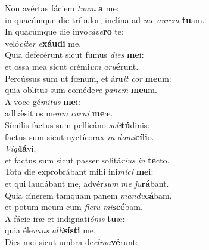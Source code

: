 \evenverse Non avértas fáciem \textit{tu}\textit{am} \textbf{a} me:~\*\\
\evenverse in quacúmque die tríbulor, inclína ad \textit{me} \textit{au}\textit{rem} \textbf{tu}am.\\
\oddverse In quacúmque die invo\textit{cá}\textit{ve}\textbf{ro} te:~\*\\
\oddverse veló\textit{ci}\textit{ter} \textit{e}\textbf{xáu}\textbf{di} me.\\
\evenverse Quia defecérunt sicut fumus \textit{di}\textit{es} \textbf{me}i:~\*\\
\evenverse et ossa mea sicut crémi\textit{um} \textit{a}\textit{ru}\textbf{é}runt.\\
\oddverse Percússus sum ut fœnum, et áru\textit{it} \textit{cor} \textbf{me}um:~\*\\
\oddverse quia oblítus sum coméde\textit{re} \textit{pa}\textit{nem} \textbf{me}um.\\
\evenverse A voce gé\textit{mi}\textit{tus} \textbf{me}i:~\*\\
\evenverse adhǽsit os me\textit{um} \textit{car}\textit{ni} \textbf{me}æ.\\
\oddverse Símilis factus sum pellicáno \textit{so}\textit{li}\textbf{tú}dinis:~\*\\
\oddverse factus sum sicut nyctícorax \textit{in} \textit{do}\textit{mi}\textbf{cí}\textbf{li}o.\\
\evenverse \textit{Vi}\textit{gi}\textbf{lá}vi,~\*\\
\evenverse et factus sum sicut passer solitá\textit{ri}\textit{us} \textit{in} \textbf{te}cto.\\
\oddverse Tota die exprobrábant mihi ini\textit{mí}\textit{ci} \textbf{me}i:~\*\\
\oddverse et qui laudábant me, advér\textit{sum} \textit{me} \textit{ju}\textbf{rá}bant.\\
\evenverse Quia cínerem tamquam panem \textit{man}\textit{du}\textbf{cá}bam,~\*\\
\evenverse et potum meum cum \textit{fle}\textit{tu} \textit{mi}\textbf{scé}bam.\\
\oddverse A fácie iræ et indignati\textit{ó}\textit{nis} \textbf{tu}æ:~\*\\
\oddverse quia éle\textit{vans} \textit{al}\textit{li}\textbf{sí}\textbf{sti} me.\\
\evenverse Dies mei sicut umbra de\textit{cli}\textit{na}\textbf{vé}runt:~\*\\
